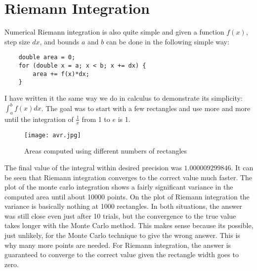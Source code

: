 \documentclass{article}
\begin{document}
\section*{Riemann Integration}
Numerical Riemann integration is also quite simple and given a function $f(x)$, step size $dx$, and bounds $a$ and $b$ can be done in the following simple way:
\begin{verbatim}
    double area = 0;
    for (double x = a; x < b; x += dx) {
        area += f(x)*dx;
    }
\end{verbatim}
I have written it the same way we do in calculus to demonstrate its simplicity: $\int_a^bf(x)dx$. The goal was to start with a few rectangles and use more and more until the integration of $\frac{1}{x}$ from 1 to $e$ is 1. 
\begin{figure}[H]
    \centering
    \texttt{[image: avr.jpg]}
    \caption{Areas computed using different numbers of rectangles}
\end{figure}
The final value of the integral within desired precision was $1.000009299846$. It can be seen that Riemann integration converges to the correct value much faster. The plot of the monte carlo integration shows a fairly significant variance in the computed area until about 10000 points. On the plot of Riemann integration the variance is basically nothing at 1000 rectangles. In both situations, the answer was still close even just after 10 trials, but the convergence to the true value takes longer with the Monte Carlo method. This makes sense because its possible, just unlikely, for the Monte Carlo technique to give the wrong answer. This is why many more points are needed. For Riemann integration, the answer is guaranteed to converge to the correct value given the rectangle width goes to zero.
\end{document}

